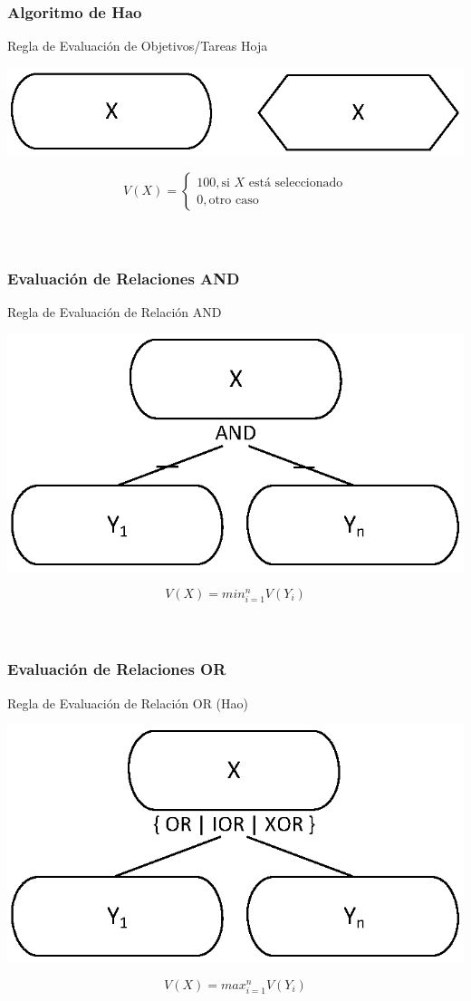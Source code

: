 \documentclass[slidestop,xcolor=pst,dvips,blue]{beamer}
\begin{document}
\begin{frame}[c]
	\frametitle{Algoritmo de Hao}
	\begin{block}{Regla de Evaluación de Objetivos/Tareas Hoja}
		\begin{center}
			\includegraphics[width=0.5\linewidth,keepaspectratio=true]{images/influences/leafGoal.eps}
		\end{center}
		\begin{equation*}
		V(X) =
		\begin{cases}
		100, \text{si\ } X \text{\ está seleccionado} \\
		0, \text{otro caso}
		\end{cases}
		\end{equation*}
		\ \\ \ \\
	\end{block}
\end{frame}

\begin{frame}[c]
	\frametitle{Evaluación de Relaciones AND}
	\begin{block}{Regla de Evaluación de Relación AND}
		\begin{center}
			\includegraphics[width=0.4\linewidth,keepaspectratio=true]{images/influences/andRelationship.eps}
		\end{center}
		\begin{equation*}
		V(X) = min_{i=1}^{n} V(Y_{i})
		\end{equation*}
		\ \\ \ \\
	\end{block}
\end{frame}

\begin{frame}[c]
	\frametitle{Evaluación de Relaciones OR}
	\begin{block}{Regla de Evaluación de Relación OR (Hao)}
		\begin{center}
			\includegraphics[width=0.4\linewidth,keepaspectratio=true]{images/influences/orRelationship.eps}
		\end{center}
		\begin{equation*}
		V(X) = max_{i=1}^{n} V(Y_{i})
		\end{equation*}
		\ \\ \ \\
	\end{block}
\end{frame}
\end{document}

